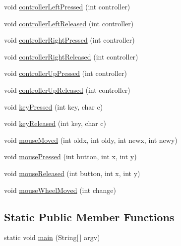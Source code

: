 \begin{DoxyCompactItemize}
void \mbox{\hyperlink{classorg_1_1newdawn_1_1slick_1_1tests_1_1_test_box_a42966953b420faab6ab9261daf38ef13}{controller\+Left\+Pressed}} (int controller)
\item 
void \mbox{\hyperlink{classorg_1_1newdawn_1_1slick_1_1tests_1_1_test_box_a52d79ff8a6f778651fff642b6d91b2de}{controller\+Left\+Released}} (int controller)
\item 
void \mbox{\hyperlink{classorg_1_1newdawn_1_1slick_1_1tests_1_1_test_box_aa1a006cc38225d293dfceec4c8995bdf}{controller\+Right\+Pressed}} (int controller)
\item 
void \mbox{\hyperlink{classorg_1_1newdawn_1_1slick_1_1tests_1_1_test_box_ac2e44af6fd71d4435f7d9ef1d2db582e}{controller\+Right\+Released}} (int controller)
\item 
void \mbox{\hyperlink{classorg_1_1newdawn_1_1slick_1_1tests_1_1_test_box_a3d43a20b538fd2f3331742cd26466274}{controller\+Up\+Pressed}} (int controller)
\item 
void \mbox{\hyperlink{classorg_1_1newdawn_1_1slick_1_1tests_1_1_test_box_ad22f577d725eaa52a02136efa4ca5f95}{controller\+Up\+Released}} (int controller)
\item 
void \mbox{\hyperlink{classorg_1_1newdawn_1_1slick_1_1tests_1_1_test_box_a8904ce9d53be074ca40305c27133a1d0}{key\+Pressed}} (int key, char c)
\item 
void \mbox{\hyperlink{classorg_1_1newdawn_1_1slick_1_1tests_1_1_test_box_a8085084aafdff326cab6a2a6d319e367}{key\+Released}} (int key, char c)
\item 
void \mbox{\hyperlink{classorg_1_1newdawn_1_1slick_1_1tests_1_1_test_box_a293c3589092e888da58b49b41fb591fd}{mouse\+Moved}} (int oldx, int oldy, int newx, int newy)
\item 
void \mbox{\hyperlink{classorg_1_1newdawn_1_1slick_1_1tests_1_1_test_box_aa9cf4accae5a92d392913ea607398032}{mouse\+Pressed}} (int button, int x, int y)
\item 
void \mbox{\hyperlink{classorg_1_1newdawn_1_1slick_1_1tests_1_1_test_box_acef576dfd82777b6a24641b5b3456275}{mouse\+Released}} (int button, int x, int y)
\item 
void \mbox{\hyperlink{classorg_1_1newdawn_1_1slick_1_1tests_1_1_test_box_a60b5186b990f70fcd47d459a75e80eb5}{mouse\+Wheel\+Moved}} (int change)
\end{DoxyCompactItemize}
\subsection*{Static Public Member Functions}
\begin{DoxyCompactItemize}
\item 
static void \mbox{\hyperlink{classorg_1_1newdawn_1_1slick_1_1tests_1_1_test_box_a0da3b7951c5a5d4c547e7adb89d0520d}{main}} (String\mbox{[}$\,$\mbox{]} argv)
\end{DoxyCompactItemize}
